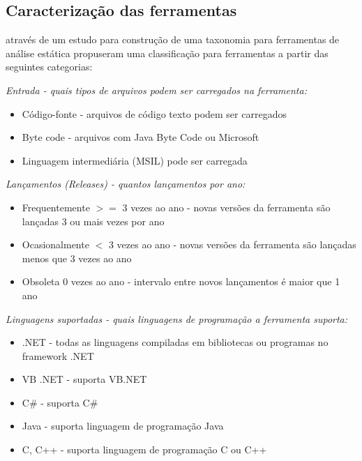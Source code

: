 \subsection{Caracterização das ferramentas} \label{caracterizacao-das-ferramentas}

 através de um estudo para construção de uma taxonomia
para ferramentas de análise estática propuseram uma classificação para
ferramentas a partir das seguintes categorias:

\begin{description}

  \item {\it Entrada - quais tipos de arquivos podem ser carregados na ferramenta:}
    \begin{itemize}
      \item Código-fonte - arquivos de código texto podem ser carregados
      \item Byte code - arquivos com Java Byte Code ou Microsoft
      \item Linguagem intermediária (MSIL) pode ser carregada
    \end{itemize}

  \item {\it Lançamentos ({\it Releases}) - quantos lançamentos por ano:}
    \begin{itemize}
      \item Frequentemente $>=$ 3 vezes ao ano - novas versões da ferramenta são lançadas 3 ou mais vezes por ano
      \item Ocasionalmente $<$ 3 vezes ao ano - novas versões da ferramenta são lançadas menos que 3 vezes ao ano
      \item Obsoleta 0 vezes ao ano - intervalo entre novos lançamentos é maior que 1 ano
    \end{itemize}

  \item {\it Linguagens suportadas - quais linguagens de programação a ferramenta suporta:}
    \begin{itemize}
      \item .NET - todas as linguagens compiladas em bibliotecas ou programas no framework .NET
      \item VB .NET - suporta VB.NET
      \item C\# - suporta C\#
      \item Java - suporta linguagem de programação Java
      \item C, C++ - suporta linguagem de programação C ou C++
    \end{itemize}


\end{description}
